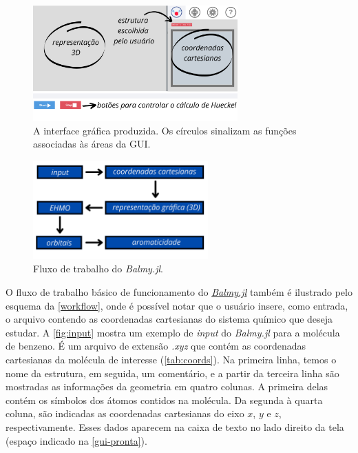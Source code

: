 \begin{figure}[htb]
	\caption{\label{gui-pronta} A interface gráfica produzida. Os círculos sinalizam as funções associadas às áreas da \gls{GUI}.}
	\begin{center}
		\includegraphics[width=0.7\textwidth]{images/GUI-EXAMPLE.png}
	\end{center}
\end{figure}

\begin{figure}[htb]
	\caption{\label{workflow} Fluxo de trabalho do \textit{Balmy.jl}.}
	\begin{center}
		\includegraphics[width=0.6\textwidth]{images/aromaticity(3).png}
	\end{center}
\end{figure}

O fluxo de trabalho básico de funcionamento do \href{https://leticia-maria.github.io/ExtendedHueckel/}{\textit{Balmy.jl}} também é ilustrado pelo esquema da \autoref{workflow}, onde é possível notar que o usuário insere, como entrada, o arquivo contendo as coordenadas cartesianas do sistema químico que deseja estudar. A \autoref{fig:input} mostra um exemplo de \textit{input} do \textit{Balmy.jl} para a molécula de benzeno. É um arquivo de extensão \textit{.xyz} que contém as coordenadas cartesianas da molécula de interesse (\autoref{tab:coords}). Na primeira linha, temos o nome da estrutura, em seguida, um comentário, e a partir da terceira linha são mostradas as informações da geometria em quatro colunas. A primeira delas contém os símbolos dos átomos contidos na molécula. Da segunda à quarta coluna, são indicadas as coordenadas cartesianas do eixo $x$, $y$ e $z$, respectivamente. Esses dados aparecem na caixa de texto no lado direito da tela (espaço indicado na \autoref{gui-pronta}).

